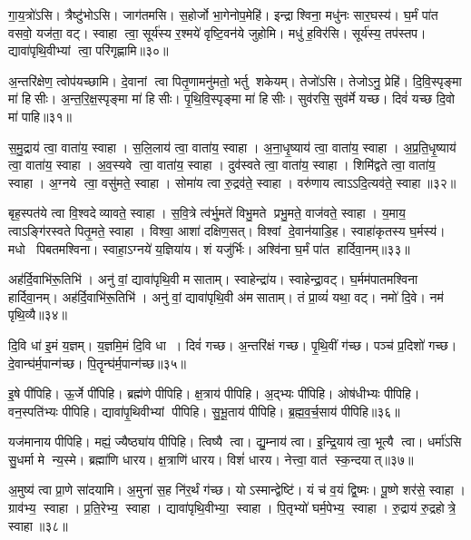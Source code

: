 गा॒य॒त्रो॑ऽसि। त्रैष्टु॑भोऽसि। जाग॑तमसि। स॒होर्जो भा॒गेनोप॒मेहि॑। इन्द्राश्विना॒ मधु॑नः सार॒घस्य॑। घ॒र्मं पा॑त वसवो॒ यज॑ता॒ वट्। स्वाहा त्वा॒ सूर्य॑स्य र॒श्मये॑ वृष्टि॒वन॑ये जुहोमि। मधु॑ ह॒विर॑सि। सूर्य॑स्य॒ तप॑स्तप। द्यावा॑पृथि॒वीभ्यां त्वा॒ परि॑गृह्णामि॥३०॥

अ॒न्तरि॑क्षेण॒ त्वोप॑यच्छामि। दे॒वानां त्वा पितृ॒णामनु॑मतो॒ भर्तु शकेयम्। तेजो॑ऽसि। तेजोऽनु॒ प्रेहि॑। दि॒वि॒स्पृङ्मा मा॑ हिसीः। अ॒न्त॒रि॒क्ष॒स्पृङ्मा मा॑ हिसीः। पृ॒थि॒वि॒स्पृङ्मा मा॑ हिसीः। सुव॑रसि॒ सुव॑र्मे यच्छ। दिवं॑ यच्छ दि॒वो मा॑ पाहि॥३१॥
\anuvakamend[एहि॑ पाहि पिन्वस्व गृह्णामि॒ नव॑ च]

स॒मु॒द्राय॑ त्वा॒ वाता॑य॒ स्वाहा। स॒लि॒लाय॑ त्वा॒ वाता॑य॒ स्वाहा। अ॒ना॒धृ॒ष्याय॑ त्वा॒ वाता॑य॒ स्वाहा। अ॒प्र॒ति॒धृ॒ष्याय॑ त्वा॒ वाता॑य॒ स्वाहा। अ॒व॒स्यवे त्वा॒ वाता॑य॒ स्वाहा। दुव॑स्वते त्वा॒ वाता॑य॒ स्वाहा। शिमि॑द्वते त्वा॒ वाता॑य॒ स्वाहा। अ॒ग्नये त्वा॒ वसु॑मते॒ स्वाहा। सोमा॑य त्वा रु॒द्रव॑ते॒ स्वाहा। वरु॑णाय त्वाऽऽदि॒त्यव॑ते॒ स्वाहा॥३२॥

बृह॒स्पत॑ये त्वा वि॒श्वदेव्यावते॒ स्वाहा। स॒वि॒त्रे त्व॑र्भु॒मते॑ विभु॒मते प्रभु॒मते॒ वाज॑वते॒ स्वाहा। य॒माय॒ त्वाऽङ्गि॑रस्वते पितृ॒मते॒ स्वाहा। विश्वा॒ आशा॑ दक्षिण॒सत्। विश्वां दे॒वान॑याडि॒ह। स्वाहा॑कृतस्य घ॒र्मस्य॑। मधो पिबतमश्विना। स्वाहा॒ऽग्नये॑ य॒ज्ञिया॑य। शं यजु॑र्भिः। अश्वि॑ना घ॒र्मं पा॑त हार्दिवा॒नम्॥३३॥

अह॑र्दि॒वाभि॑रू॒तिभि॑। अनु॑ वां॒ द्यावा॑पृथि॒वी मसाताम्। स्वाहेन्द्रा॑य। स्वाहेन्द्रा॒वट्। घ॒र्मम॑पातमश्विना हार्दिवा॒नम्। अह॑र्दि॒वाभि॑रू॒तिभि॑। अनु॑ वां॒ द्यावा॑पृथि॒वी अ॑मसाताम्। तं प्रा॒व्यं॑ यथा॒ वट्। नमो॑ दि॒वे। नम॑ पृथि॒व्यै॥३४॥

दि॒वि धा॑ इ॒मं य॒ज्ञम्। य॒ज्ञमि॒मं दि॒वि धा। दिवं॑ गच्छ। अ॒न्तरि॑क्षं गच्छ। पृ॒थि॒वीं ग॑च्छ। पञ्च॑ प्र॒दिशो॑ गच्छ। दे॒वान्घ॑र्म॒पान्ग॑च्छ। पि॒तॄन्घ॑र्म॒पान्ग॑च्छ॥३५॥
\anuvakamend[आ॒दि॒त्यव॑ते॒ स्वाहा॑ हार्दिवा॒नं पृ॑थि॒व्या अ॒ष्टौ च॑]

इ॒षे पी॑पिहि। ऊ॒र्जे पी॑पिहि। ब्रह्म॑णे पीपिहि। क्ष॒त्राय॑ पीपिहि। अ॒द्भ्यः पी॑पिहि। ओष॑धीभ्यः पीपिहि। वन॒स्पति॑भ्यः पीपिहि। द्यावा॑पृ॒थिवीभ्यां पीपिहि। सु॒भू॒ताय॑ पीपिहि। ब्र॒ह्म॒व॒र्च॒साय॑ पीपिहि॥३६॥

यज॑मानाय पीपिहि। मह्यं॒ ज्यैष्ठ्या॑य पीपिहि। त्विष्यै त्वा। द्यु॒म्नाय॑ त्वा। इ॒न्द्रि॒याय॑ त्वा॒ भूत्यै त्वा। धर्मा॑ऽसि सु॒धर्मा मे न्य॒स्मे। ब्रह्मा॑णि धारय। क्ष॒त्राणि॑ धारय। विशं॑ धारय। नेत्त्वा॒ वात॑ स्क॒न्दयात्॥३७॥

अ॒मुष्य॑ त्वा प्रा॒णे सा॑दयामि। अ॒मुना॑ स॒ह नि॑र॒र्थं ग॑च्छ। योऽस्मान्द्वेष्टि॑। यं च॑ व॒यं द्वि॒ष्मः। पू॒ष्णे शर॑से॒ स्वाहा। ग्राव॑भ्य॒ स्वाहा। प्र॒ति॒रेभ्य॒ स्वाहा। द्यावा॑पृथि॒वीभ्या॒ स्वाहा। पि॒तृभ्यो॑ घर्म॒पेभ्य॒ स्वाहा। रु॒द्राय॑ रु॒द्रहोत्रे॒ स्वाहा॥३८॥

